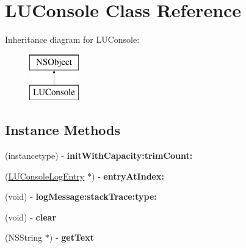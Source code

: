 \hypertarget{interface_l_u_console}{}\section{L\+U\+Console Class Reference}
\label{interface_l_u_console}
Inheritance diagram for L\+U\+Console\+:\begin{figure}[H]
\begin{center}
\leavevmode
\includegraphics[height=2.000000cm]{interface_l_u_console}
\end{center}
\end{figure}
\subsection*{Instance Methods}
\begin{DoxyCompactItemize}
\item 
\mbox{\label{interface_l_u_console_aaa968ebb3c79b869253a1da377b1cb72}} 
(instancetype) -\/ {\bfseries init\+With\+Capacity\+:trim\+Count\+:}
\item 
\mbox{\label{interface_l_u_console_ade5de9e83803fe74dc7c8a9568573374}} 
(\mbox{\hyperlink{interface_l_u_console_log_entry}{L\+U\+Console\+Log\+Entry}} $\ast$) -\/ {\bfseries entry\+At\+Index\+:}
\item 
\mbox{\label{interface_l_u_console_aef0d09df38b6fb3b63e0d3ca98abce77}} 
(void) -\/ {\bfseries log\+Message\+:stack\+Trace\+:type\+:}
\item 
\mbox{\label{interface_l_u_console_a99995634fbe13b6ff6fdfebf763a7719}} 
(void) -\/ {\bfseries clear}
\item 
\mbox{\label{interface_l_u_console_a604bab36797505d32e84052c78e1859a}} 
(N\+S\+String $\ast$) -\/ {\bfseries get\+Text}
\end{DoxyCompactItemize}

